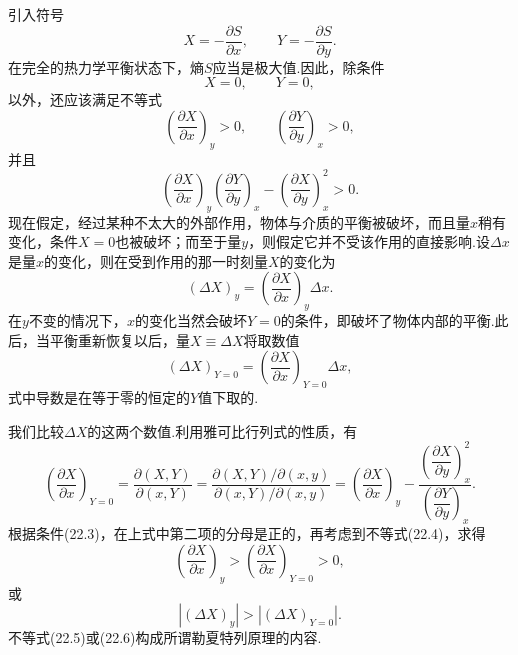 引入符号
\begin{equation}
  X=-\frac{\partial S}{\partial x},\qquad
  Y=-\frac{\partial S}{\partial y}.
\end{equation}
在完全的热力学平衡状态下，熵$S$应当是极大值.因此，除条件
\begin{equation}
  X=0,\qquad Y=0,
\end{equation}
以外，还应该满足不等式
\begin{equation}
  \left(\frac{\partial X}{\partial x}\right)_y>0,\qquad
  \left(\frac{\partial Y}{\partial y}\right)_x>0,
\end{equation}
并且
\begin{equation}
  \left(\frac{\partial X}{\partial x}\right)_y
  \left(\frac{\partial Y}{\partial y}\right)_x
  -\left(\frac{\partial X}{\partial y}\right)_x^2>0.
\end{equation}
现在假定，经过某种不太大的外部作用，物体与介质的平衡被破坏，而且量$x$稍有变化，条件$X=0$也被破坏；而至于量$y$，则假定它并不受该作用的直接影响.设$\Delta x$是量$x$的变化，则在受到作用的那一时刻量$X$的变化为
\begin{equation*}
  (\Delta X)_y
  =\left(\frac{\partial X}{\partial x}\right)_y\Delta x.
\end{equation*}
在$y$不变的情况下，$x$的变化当然会破坏$Y=0$的条件，即破坏了物体内部的平衡.此后，当平衡重新恢复以后，量$X\equiv\Delta X$将取数值
\begin{equation*}
  (\Delta X)_{Y=0}
  =\left(\frac{\partial X}{\partial x}\right)_{Y=0}\Delta x,
\end{equation*}
式中导数是在等于零的恒定的$Y$值下取的.

我们比较$\Delta X$的这两个数值.利用雅可比行列式的性质，有
\begin{equation*}
  \left(\frac{\partial X}{\partial x}\right)_{Y=0}
  =\frac{\partial(X,Y)}{\partial(x,Y)}
  =\frac{\partial(X,Y)/\partial(x,y)}
  {\partial(x,Y)/\partial(x,y)}
  =\left(\frac{\partial X}{\partial x}\right)_y
  -\frac{\left(\dfrac{\partial X}{\partial y}\right)_x^2}
  {\left(\dfrac{\partial Y}{\partial y}\right)_x}.
\end{equation*}
根据条件(22.3)，在上式中第二项的分母是正的，再考虑到不等式(22.4)，求得
\begin{equation}
  \left(\frac{\partial X}{\partial x}\right)_y
  >\left(\frac{\partial X}{\partial x}\right)_{Y=0}>0,
\end{equation}
或
\begin{equation}
  |(\Delta X)_y|>|(\Delta X)_{Y=0}|.
\end{equation}
不等式(22.5)或(22.6)构成所谓勒夏特列原理的内容.

